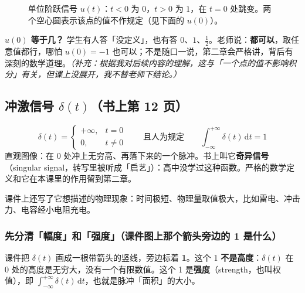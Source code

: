 \documentclass[UTF8,a4paper,11pt]{ctexart}
\renewcommand{\d}{\,\mathrm{d}}
\begin{document}
\begin{figure}[H]
\centering
{}
\caption{单位阶跃信号 $u(t)$：$t<0$ 为 $0$，$t>0$ 为 $1$，在 $t=0$ 处跳变。两个空心圆表示该点的值不作规定（见下面的 $u(0)$）。}
\end{figure}

\textbf{$u(0)$ 等于几？} 学生有人答「没定义」，也有答 $0$、$1$、$\tfrac12$。老师说：\textbf{都可以}，取任意值都行，哪怕 $u(0)=-1$ 也可以；不是随口一说，第二章会严格讲，背后有深刻的数学道理。\emph{（补充：根据我对后续内容的理解，这与「一个点的值不影响积分」有关，但课上没展开，我不替老师下结论。）}

\subsection{冲激信号 $\delta(t)$（书上第 12 页）}
\[
\delta(t)=\begin{cases}+\infty,&t=0\\0,&t\neq 0\end{cases}
\qquad\text{且人为规定}\qquad
\int_{-\infty}^{+\infty}\delta(t)\d t=1
\]
直观图像：在 $0$ 处冲上无穷高、再落下来的一个脉冲。书上叫它\textbf{奇异信号}（singular signal，转写里被听成「启艺」）：高中没学过这种函数。严格的数学定义和它在本课里的作用留到第二章。

课件上还写了它想描述的物理现象：时间极短、物理量取值极大，比如雷电、冲击力、电容经小电阻充电。

\subsubsection*{先分清「幅度」和「强度」（课件图上那个箭头旁边的 1 是什么）}
课件把 $\delta(t)$ 画成一根带箭头的竖线，旁边标着 \textbf{1}。这个 1 \textbf{不是高度}：$\delta(t)$ 在 $0$ 处的高度是无穷大，没有一个有限数值。这个 1 是\textbf{强度}（strength，也叫权值），即 $\int_{-\infty}^{+\infty}\delta(t)\d t$，也就是脉冲「面积」的大小。
\end{document}
